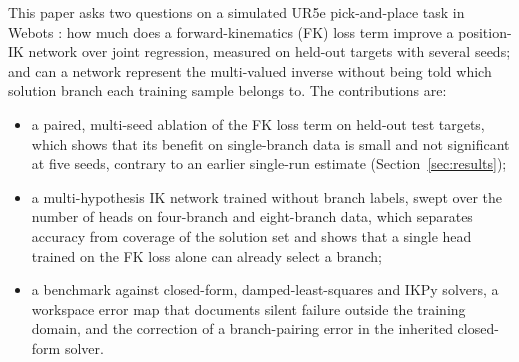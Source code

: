 \documentclass[11pt]{article}
\begin{document}
This paper asks two questions on a simulated UR5e pick-and-place task in
Webots \citep{michel2004webots}: how much does a forward-kinematics (FK) loss
term improve a position-IK network over joint regression, measured on held-out
targets with several seeds; and can a network represent the multi-valued
inverse without being told which solution branch each training sample belongs
to. The contributions are:
\begin{itemize}
  \item a paired, multi-seed ablation of the FK loss term on held-out test
        targets, which shows that its benefit on single-branch data is small
        and not significant at five seeds, contrary to an earlier single-run
        estimate (Section~\ref{sec:results});
  \item a multi-hypothesis IK network trained without branch labels, swept over
        the number of heads on four-branch and eight-branch data, which
        separates accuracy from coverage of the solution set and shows that a
        single head trained on the FK loss alone can already select a branch;
  \item a benchmark against closed-form, damped-least-squares and IKPy solvers,
        a workspace error map that documents silent failure outside the
        training domain, and the correction of a branch-pairing error in the
        inherited closed-form solver.
\end{itemize}
\end{document}
